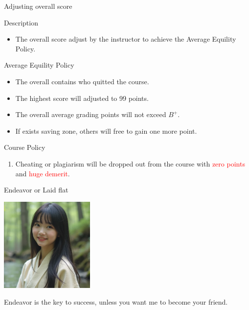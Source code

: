 \documentclass{beamer}
\begin{document}
\begin{frame}{Adjusting overall score}
\begin{block}{Description}
\begin{itemize}
\item The overall score adjust by the instructor to achieve the Average Equility Policy.
\end{itemize}
\end{block}
\begin{block}{Average Equility Policy}
\begin{itemize}
\item The overall contains who quitted the course.
\item The highest score will adjusted to 99 points.
\item The overall average grading points will not exceed $B^+$.
\item If exists saving zone, others will free to gain one more point.
\end{itemize}
\end{block}
\end{frame}
\begin{frame}{Course Policy}
\begin{enumerate}
\item Cheating or plagiarism will be dropped out from the course with \textcolor{red}{zero points} and \textcolor{red}{huge demerit}. \\
\end{enumerate}
\end{frame}
\begin{frame}{Endeavor or Laid flat}
\begin{center}
\includegraphics[width=0.35\textwidth]{fail.png}
\end{center}
\begin{center}
Endeavor is the key to success, unless you want me to become your friend.
\end{center}
\end{frame}
\end{document}
